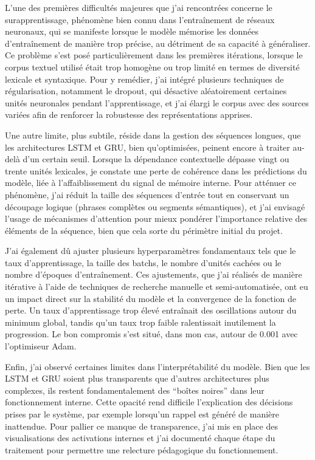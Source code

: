 \documentclass[11pt,a4paper]{report}
\begin{document}
L’une des premières difficultés majeures que j’ai rencontrées concerne le surapprentissage, phénomène bien connu dans l’entraînement de réseaux neuronaux, qui se manifeste lorsque le modèle mémorise les données d’entraînement de manière trop précise, au détriment de sa capacité à généraliser. Ce problème s’est posé particulièrement dans les premières itérations, lorsque le corpus textuel utilisé était trop homogène ou trop limité en termes de diversité lexicale et syntaxique. Pour y remédier, j’ai intégré plusieurs techniques de régularisation, notamment le dropout, qui désactive aléatoirement certaines unités neuronales pendant l’apprentissage, et j’ai élargi le corpus avec des sources variées afin de renforcer la robustesse des représentations apprises.

Une autre limite, plus subtile, réside dans la gestion des séquences longues, que les architectures LSTM et GRU, bien qu’optimisées, peinent encore à traiter au-delà d’un certain seuil. Lorsque la dépendance contextuelle dépasse vingt ou trente unités lexicales, je constate une perte de cohérence dans les prédictions du modèle, liée à l’affaiblissement du signal de mémoire interne. Pour atténuer ce phénomène, j’ai réduit la taille des séquences d’entrée tout en conservant un découpage logique (phrases complètes ou segments sémantiques), et j’ai envisagé l’usage de mécanismes d’attention pour mieux pondérer l’importance relative des éléments de la séquence, bien que cela sorte du périmètre initial du projet.

J’ai également dû ajuster plusieurs hyperparamètres fondamentaux tels que le taux d’apprentissage, la taille des batchs, le nombre d’unités cachées ou le nombre d’époques d’entraînement. Ces ajustements, que j’ai réalisés de manière itérative à l’aide de techniques de recherche manuelle et semi-automatisée, ont eu un impact direct sur la stabilité du modèle et la convergence de la fonction de perte. Un taux d’apprentissage trop élevé entraînait des oscillations autour du minimum global, tandis qu’un taux trop faible ralentissait inutilement la progression. Le bon compromis s’est situé, dans mon cas, autour de 0.001 avec l’optimiseur Adam.

Enfin, j’ai observé certaines limites dans l’interprétabilité du modèle. Bien que les LSTM et GRU soient plus transparents que d’autres architectures plus complexes, ils restent fondamentalement des “boîtes noires” dans leur fonctionnement interne. Cette opacité rend difficile l’explication des décisions prises par le système, par exemple lorsqu’un rappel est généré de manière inattendue. Pour pallier ce manque de transparence, j’ai mis en place des visualisations des activations internes et j’ai documenté chaque étape du traitement pour permettre une relecture pédagogique du fonctionnement.
\end{document}
